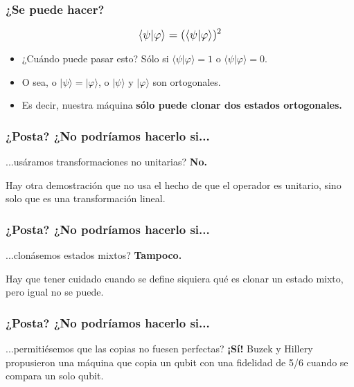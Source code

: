 \documentclass[12pt]{beamer}
\newcommand{\ket}[1]{| #1 \rangle}
\newcommand{\braket}[2]{\langle #1 |#2\rangle}
\begin{document}
\begin{frame}
    \frametitle{¿Se puede hacer?}
    \[\mathlarger{
        \braket{\psi}{\varphi} =
        (\braket{\psi}{\varphi}) ^ 2
    }\]
    \begin{itemize}
        \item ¿Cuándo puede pasar esto?
            Sólo si \( \braket{\psi}{\varphi} = 1 \) o
            \( \braket{\psi}{\varphi} = 0 \). \pause
        \item O sea, o \( \ket{\psi} = \ket{\varphi} \),
            o \( \ket{\psi} \) y \( \ket{\varphi} \) son ortogonales. \pause
        \item Es decir, nuestra máquina
            \textbf{sólo puede clonar dos estados ortogonales.}
    \end{itemize}
\end{frame}

\begin{frame}
    \frametitle{¿Posta? ¿No podríamos hacerlo si...}
    ...usáramos transformaciones no unitarias? \pause \textbf{No.} \cite{demo-lineal}

    Hay otra demostración que no usa el hecho de que el operador es unitario, sino solo que es una transformación lineal.

\end{frame}
\begin{frame}
    \frametitle{¿Posta? ¿No podríamos hacerlo si...}
    ...clonásemos estados mixtos? \pause \textbf{Tampoco.} \cite{broadcast}

    Hay que tener cuidado cuando se define siquiera qué es clonar un estado
    mixto, pero igual no se puede.
\end{frame}

\begin{frame}
    \frametitle{¿Posta? ¿No podríamos hacerlo si...}
    ...permitiésemos que las copias no fuesen perfectas? \pause \textbf{ ¡Sí!} \cite{copying}
    Buzek y Hillery propusieron una máquina que copia un qubit con una fidelidad de 5/6 cuando se compara un solo qubit.
\end{frame}
\end{document}
